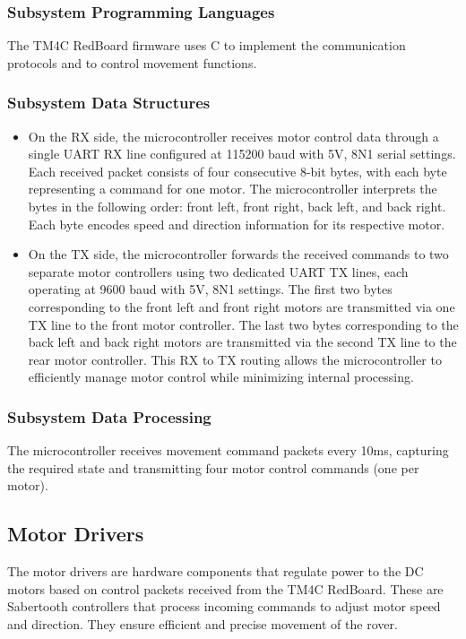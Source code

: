 \subsubsection{Subsystem Programming Languages}
The TM4C RedBoard firmware uses C to implement the communication protocols and to control movement functions.

\subsubsection{Subsystem Data Structures}
\begin{itemize}
    \item On the RX side, the microcontroller receives motor control data through a single UART RX line configured at 115200 baud with 5V, 8N1 serial settings. Each received packet consists of four consecutive 8-bit bytes, with each byte representing a command for one motor. The microcontroller interprets the bytes in the following order: front left, front right, back left, and back right. Each byte encodes speed and direction information for its respective motor.
    \item On the TX side, the microcontroller forwards the received commands to two separate motor controllers using two dedicated UART TX lines, each operating at 9600 baud with 5V, 8N1 settings. The first two bytes corresponding to the front left and front right motors are transmitted via one TX line to the front motor controller. The last two bytes corresponding to the back left and back right motors are transmitted via the second TX line to the rear motor controller. This RX to TX routing allows the microcontroller to efficiently manage motor control while minimizing internal processing.
\end{itemize}

\subsubsection{Subsystem Data Processing}
The microcontroller receives movement command packets every 10ms, capturing the required state and transmitting four motor control commands (one per motor).
\newpage




\subsection{Motor Drivers}
The motor drivers \cite{Sabertooth} are hardware components that regulate power to the DC motors based on control packets received from the TM4C RedBoard. These are Sabertooth controllers that process incoming commands to adjust motor speed and direction. They ensure efficient and precise movement of the rover.


